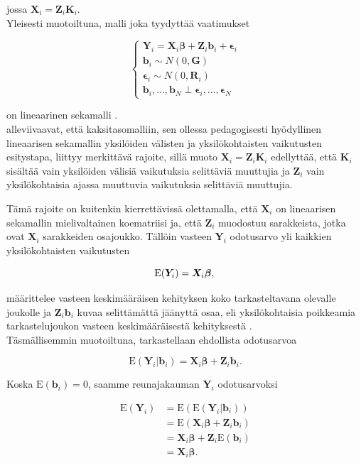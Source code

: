 \documentclass[finnish]{docopts}
\begin{document}
jossa $\bm{X}_i = \bm{Z}_i \bm{K}_i$. \\

Yleisesti muotoiltuna, malli joka tyydyttää vaatimukset

$$
\left\{
    \begin{array}{ll}
        \bm{Y}_i = \bm{X}_i \bm{\beta} + \bm{Z}_i \bm{b}_i + \bm{\epsilon}_i \\
        \bm{b}_i \sim N(0,\bm{G}) \\
        \bm{\epsilon}_i \sim N(0,\bm{R}_i) \\
        \bm{b}_i, \dots , \bm{b}_N \perp \bm{\epsilon}_i, \dots , \bm{\epsilon}_N 
    \end{array}
\right.
$$

on lineaarinen sekamalli \cite{verbeke00, laird82}.\\


\cite{fitzmaurice11} alleviivaavat, että kaksitasomalliin, sen ollessa pedagogisesti hyödyllinen lineaarisen sekamallin yksilöiden välisten ja yksilökohtaisten vaikutusten esitystapa, liittyy merkittävä rajoite, sillä muoto  $\bm{X}_i = \bm{Z}_i \bm{K}_i$ edellyttää, että $\bm{K}_i$ sisältää vain yksilöiden välisiä vaikutuksia selittäviä muuttujia ja $\bm{Z}_i$ vain yksilökohtaisia ajassa muuttuvia vaikutuksia selittäviä muuttujia.

Tämä rajoite on kuitenkin kierrettävissä olettamalla, että $\bm{X}_i$ on lineaarisen sekamallin mielivaltainen koematriisi ja, että $\bm{Z}_i$ muodostuu sarakkeista, jotka ovat $\bm{X}_i$ sarakkeiden osajoukko. Tällöin vasteen $\bm{Y}_i$ odotusarvo yli kaikkien yksilökohtaisten vaikutusten

$$
\text{E}(\bm{Y}_i) = \bm{X}_i \bm{\beta}, \\
$$

määrittelee vasteen keskimääräisen kehityksen koko tarkasteltavana olevalle joukolle ja $\bm{Z}_i \bm{b}_i$ kuvaa selittämättä jäänyttä osaa, eli yksilökohtaisia poikkeamia tarkastelujoukon vasteen keskimääräisestä kehityksestä \cite{fitzmaurice11}. \\

Täsmällisemmin muotoiltuna, tarkastellaan ehdollista odotusarvoa

$$
\text{E}(\bm{Y}_i | \bm{b}_i) = \bm{X}_i \bm{\beta} + \bm{Z}_i \bm{b}_i.
$$

Koska $\text{E}(\bm{b}_i) = 0$, saamme reunajakauman $\bm{Y}_i$ odotusarvoksi

$$
\begin{aligned}
\text{E}(\bm{Y}_i) &=  \text{E}(\text{E}(\bm{Y}_i | \bm{b}_i)) \\
&=  \text{E}(\bm{X}_i \bm{\beta} + \bm{Z}_i \bm{b}_i) \\
&=  \bm{X}_i \bm{\beta} + \bm{Z}_i \text{E}(\bm{b}_i) \\
&=  \bm{X}_i \bm{\beta}. \\
\end{aligned}
$$
\end{document}
